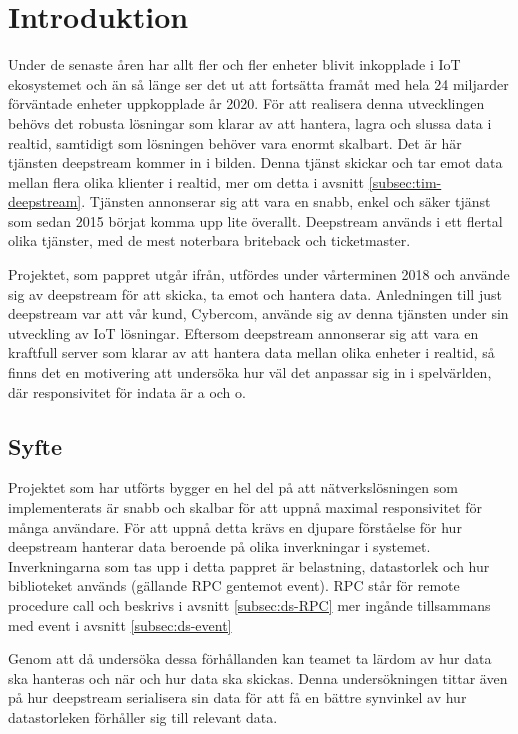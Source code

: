 \section{Introduktion}

Under de senaste åren har allt fler och fler enheter blivit inkopplade i IoT ekosystemet och än så länge ser det ut att fortsätta framåt med hela 24 miljarder förväntade enheter uppkopplade år 2020\cite{IoT-ecosystem}. För att realisera denna utvecklingen behövs det robusta lösningar som klarar av att hantera, lagra och slussa data i realtid, samtidigt som lösningen behöver vara enormt skalbart. Det är här tjänsten deepstream\cite{deepstream} kommer in i bilden. Denna tjänst skickar och tar emot data mellan flera olika klienter i realtid, mer om detta i avsnitt \ref{subsec:tim-deepstream}. Tjänsten annonserar sig att vara en snabb, enkel och säker tjänst som sedan 2015 börjat komma upp lite överallt. Deepstream används i ett flertal olika tjänster, med de mest noterbara briteback och ticketmaster\cite{ds-usecases}.

Projektet, som pappret utgår ifrån, utfördes under vårterminen 2018 och använde sig av deepstream för att skicka, ta emot och hantera data. Anledningen till just deepstream var att vår kund, Cybercom, använde sig av denna tjänsten under sin utveckling av IoT lösningar. Eftersom deepstream annonserar sig att vara en kraftfull server som klarar av att hantera data mellan olika enheter i realtid, så finns det en motivering att undersöka hur väl det anpassar sig in i spelvärlden, där responsivitet för indata är a och o.

\subsection{Syfte}
\label{subsec:tim-aim}
Projektet som har utförts bygger en hel del på att nätverkslösningen som implementerats är snabb och skalbar för att uppnå maximal responsivitet för många användare. För att uppnå detta krävs en djupare förståelse för hur deepstream hanterar data beroende på olika inverkningar i systemet. Inverkningarna som tas upp i detta pappret är belastning, datastorlek och hur biblioteket används (gällande RPC gentemot event). RPC står för remote procedure call och beskrivs i avsnitt \ref{subsec:ds-RPC} mer ingånde tillsammans med event i avsnitt \ref{subsec:ds-event}

Genom att då undersöka dessa förhållanden kan teamet ta lärdom av hur data ska hanteras och när och hur data ska skickas. Denna undersökningen tittar även på hur deepstream serialisera sin data för att få en bättre synvinkel av hur datastorleken förhåller sig till relevant data.

